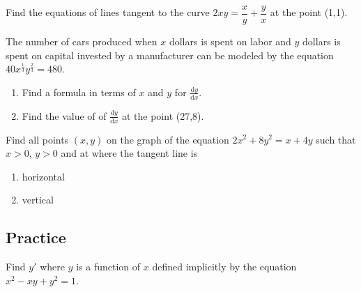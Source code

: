 \begin{example}

Find the equations of lines tangent to the curve
\(2xy=\dfrac xy+\dfrac yx\) at the point (1,1).

\end{example}
\vspace*{6\baselineskip}

\begin{example}

The number of cars produced when \(x\) dollars is spent on labor and
\(y\) dollars is spent on capital invested by a manufacturer can be
modeled by the equation \(\displaystyle 40x^{\frac13} y^{\frac23}=480\).

\begin{enumerate}
\item
  Find a formula in terms of \(x\) and \(y\) for
  \(\displaystyle \frac{\mathrm{d}{y}}{\mathrm{d}{x}}\). \hspace{0pt}
\item
  Find the value of of
  \(\displaystyle \frac{\mathrm{d}{y}}{\mathrm{d}{x}}\) at the point
  (27,8).
\end{enumerate}

\end{example}

\begin{example}

Find all points \((x,y)\) on the graph of the equation
\(2x^2 + 8y^2= x + 4 y\) such that \(x>0\), \(y>0\) and at where the
tangent line is

\begin{enumerate}
\item
  horizontal
\item
  vertical
\end{enumerate}

\end{example}

\subsection{Practice}

\begin{exercise}

Find \(y'\) where \(y\) is a function of \(x\) defined implicitly by the
equation \(x^2-xy+y^2=1\).

\end{exercise}
\vspace*{6\baselineskip}


